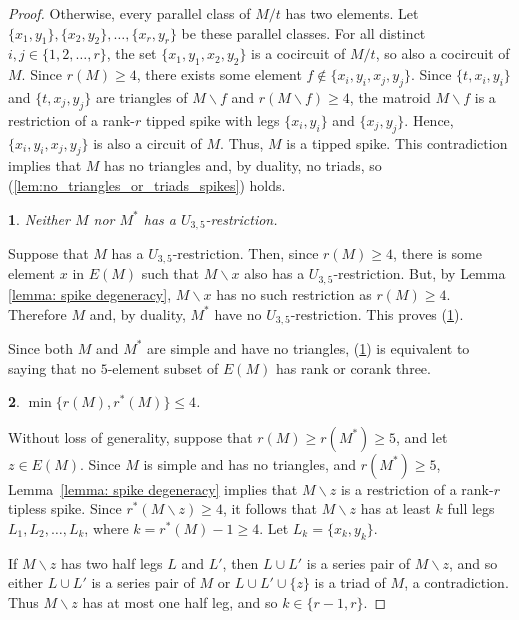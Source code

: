 \documentclass[11pt]{amsart}
\newtheorem{sublemma}{}[theorem]
\numberwithin{equation}{section} %
\begin{document}
\begin{proof}
Otherwise, every parallel class of $M / t$ has two elements. Let $\{x_1,y_1\},\{x_2,y_2\},\ldots,\{x_r,y_r\}$ be these parallel classes. For all distinct $i,j \in \{1,2,\ldots,r\}$, the set $\{x_1,y_1,x_2,y_2\}$ is a cocircuit of $M / t$, so also a cocircuit of $M$. Since $r(M)\geq 4$, there exists some element $f\not\in \{x_i,y_i,x_j,y_j\}$. Since $\{t,x_i,y_i\}$ and $\{t,x_j,y_j\}$ are triangles of $M\backslash f$ and $r(M\backslash f)\ge 4$, the matroid $M\backslash f$ is a restriction of a rank-$r$  tipped spike with legs $\{x_i,y_i\}$ and $\{x_j,y_j\}$. Hence, $\{x_i,y_i,x_j,y_j\}$ is also a circuit of $M$. Thus, $M$ is a tipped spike. This contradiction implies that $M$ has no triangles and, by duality, no triads, so (\ref{lem:no_triangles_or_triads_spikes}) holds.

\begin{sublemma}
\label{lem:no_u35_spikes}
Neither $M$ nor $M^*$ has a $U_{3,5}$-restriction.
\end{sublemma}

Suppose that $M$ has a $U_{3,5}$-restriction. Then, since $r(M)\geq 4$, there is some element $x$ in $E(M)$ such that $M\backslash x$ also has a $U_{3,5}$-restriction. But, by Lemma \ref{lemma: spike degeneracy}, $M\backslash x$ has no such restriction as $r(M)\ge 4$. Therefore $M$ and, by duality, $M^*$ have no $U_{3, 5}$-restriction. This proves (\ref{lem:no_u35_spikes}).

Since both $M$ and $M^*$ are simple and have no triangles, (\ref{lem:no_u35_spikes}) is equivalent to saying that no $5$-element subset of $E(M)$ has rank or corank three.

\begin{sublemma}
\label{rank bound}
$\min\{r(M), r^*(M)\}\leq 4$. 
\end{sublemma}

Without loss of generality, suppose that $r(M)\geq r(M^*)\geq 5$, and let $z\in E(M)$. Since $M$ is simple and has no triangles, and $r(M^*)\ge 5$, Lemma~\ref{lemma: spike degeneracy} implies that $M\backslash z$ is a restriction of a rank-$r$ tipless spike. Since $r^*(M\backslash z)\geq 4$, it follows that $M\backslash z$ has at least $k$ full legs $L_1, L_2, \dots, L_{k}$, where $k=r^*(M)-1\ge 4$. Let $L_k=\{x_k, y_k\}$.

If $M\backslash z$ has two half legs $L$ and $L'$, then $L\cup L'$ is a series pair of $M\backslash z$, and so either $L\cup L'$ is a series pair of $M$ or $L\cup L'\cup \{z\}$ is a triad of $M$, a contradiction. Thus $M\backslash z$ has at most one half leg, and so $k\in \{r-1, r\}$.


\end{proof}
\end{document}
